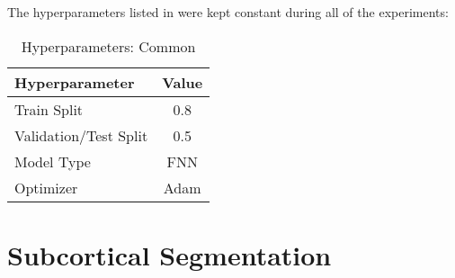 \label{experiments}

The hyperparameters listed in  were kept constant during all of the experiments:
\begin{table}[H]
\centering
\begin{tabular}{|l|c|}
\hline
\textbf{Hyperparameter} & \textbf{Value} \\ \hline
Train Split & 0.8 \\ \hline
Validation/Test Split & 0.5 \\ \hline
Model Type & \ac{FNN} \\ \hline
Optimizer & Adam \\ \hline
\end{tabular}
\caption{Hyperparameters: Common}
\label{tab:hypcom}
\end{table}

\section{Subcortical Segmentation}

